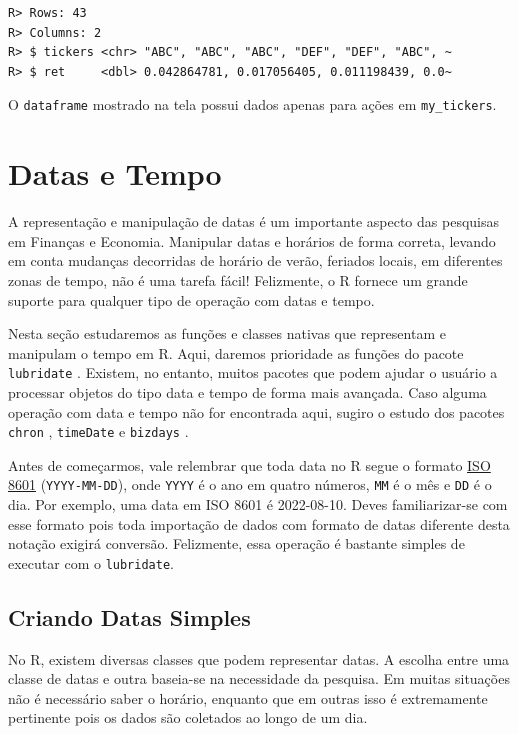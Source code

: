 \documentclass[
  11pt,
]{book}
\begin{document}
\begin{verbatim}
R> Rows: 43
R> Columns: 2
R> $ tickers <chr> "ABC", "ABC", "ABC", "DEF", "DEF", "ABC", ~
R> $ ret     <dbl> 0.042864781, 0.017056405, 0.011198439, 0.0~
\end{verbatim}

O \texttt{dataframe} mostrado na tela possui dados apenas para ações em \texttt{my\_tickers}.

\hypertarget{datas-e-tempo}{%
\section{Datas e Tempo}\label{datas-e-tempo}}

A representação e manipulação de datas é um importante aspecto das pesquisas em Finanças e Economia. Manipular datas e horários de forma correta, levando em conta mudanças decorridas de horário de verão, feriados locais, em diferentes zonas de tempo, não é uma tarefa fácil! Felizmente, o R fornece um grande suporte para qualquer tipo de operação com datas e tempo.

Nesta seção estudaremos as funções e classes nativas que representam e manipulam o tempo em R. Aqui, daremos prioridade as funções do pacote \texttt{lubridate} \citep{R-lubridate}. Existem, no entanto, muitos pacotes que podem ajudar o usuário a processar objetos do tipo data e tempo de forma mais avançada. Caso alguma operação com data e tempo não for encontrada aqui, sugiro o estudo dos pacotes \texttt{chron} \citep{R-chron}, \texttt{timeDate} \citep{R-timeDate} e \texttt{bizdays} \citep{R-bizdays}.   

Antes de começarmos, vale relembrar que toda data no R segue o formato \href{https://www.iso.org/iso-8601-date-and-time-format.html}{ISO 8601} (\texttt{YYYY-MM-DD}), onde \texttt{YYYY} é o ano em quatro números, \texttt{MM} é o mês e \texttt{DD} é o dia. Por exemplo, uma data em ISO 8601 é 2022-08-10. Deves familiarizar-se com esse formato pois toda importação de dados com formato de datas diferente desta notação exigirá conversão. Felizmente, essa operação é bastante simples de executar com o \texttt{lubridate}.

\hypertarget{criando-datas-simples}{%
\subsection{Criando Datas Simples}\label{criando-datas-simples}}

No R, existem diversas classes que podem representar datas. A escolha entre uma classe de datas e outra baseia-se na necessidade da pesquisa. Em muitas situações não é necessário saber o horário, enquanto que em outras isso é extremamente pertinente pois os dados são coletados ao longo de um dia.
\end{document}
